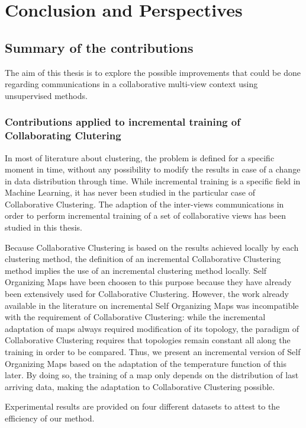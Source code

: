 \chapter{Conclusion and Perspectives}

\minitoc{}
\newpage

\section{Summary of the contributions}
The aim of this thesis is to explore the possible improvements that could be done regarding communications in a collaborative multi-view context using unsupervised methods.

\subsection{Contributions applied to incremental training of Collaborating Clutering}

In most of literature about clustering, the problem is defined for a specific moment in time, without any possibility to modify the results in case of a change in data distribution through time. While incremental training is a specific field in Machine Learning, it has never been studied in the particular case of Collaborative Clustering. The adaption of the inter-views communications in order to perform incremental training of a set of collaborative views has been studied in this thesis.

Because Collaborative Clustering is based on the results achieved locally by each clustering method, the definition of an incremental Collaborative Clustering method implies the use of an incremental clustering method locally. Self Organizing Maps have been choosen to this purpose because they have already been extensively used for Collaborative Clustering. However, the work already available in the literature on incremental Self Organizing Maps was incompatible with the requirement of Collaborative Clustering: while the incremental adaptation of maps always required modification of its topology, the paradigm of Collaborative Clustering requires that topologies remain constant all along the training in order to be compared. Thus, we present an incremental version of Self Organizing Maps based on the adaptation of the temperature function of this later. By doing so, the training of a map only depends on the distribution of last arriving data, making the adaptation to Collaborative Clustering possible.

Experimental results are provided on four different datasets to attest to the efficiency of our method.


